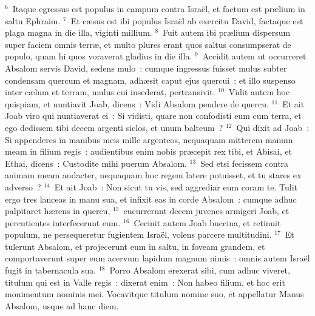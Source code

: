${}^{6}$~Itaque egressus est populus in campum contra Isra\"el, et factum est pr\ae lium in saltu Ephraim.
${}^{7}$~Et c\ae sus est ibi populus Isra\"el ab exercitu David, factaque est plaga magna in die illa, viginti millium.
${}^{8}$~Fuit autem ibi pr\ae lium dispersum super faciem omnis terr\ae , et multo plures erant quos saltus consumpserat de populo, quam hi quos voraverat gladius in die illa.
${}^{9}$~Accidit autem ut occurreret Absalom servis David, sedens mulo~: cumque ingressus fuisset mulus subter condensam quercum et magnam, adh\ae sit caput ejus quercui~: et illo suspenso inter c\ae lum et terram, mulus cui insederat, pertransivit.
${}^{10}$~Vidit autem hoc quispiam, et nuntiavit Joab, dicens~: Vidi Absalom pendere de quercu.
${}^{11}$~Et ait Joab viro qui nuntiaverat ei~: Si vidisti, quare non confodisti eum cum terra, et ego dedissem tibi decem argenti siclos, et unum balteum~?
${}^{12}$~Qui dixit ad Joab~: Si appenderes in manibus meis mille argenteos, nequaquam mitterem manum meam in filium regis~: audientibus enim nobis pr\ae cepit rex tibi, et Abisai, et Ethai, dicens~: Custodite mihi puerum Absalom.
${}^{13}$~Sed etsi fecissem contra animam meam audacter, nequaquam hoc regem latere potuisset, et tu stares ex adverso~?
${}^{14}$~Et ait Joab~: Non sicut tu vis, sed aggrediar eum coram te. Tulit ergo tres lanceas in manu sua, et infixit eas in corde Absalom~: cumque adhuc palpitaret h\ae rens in quercu,
${}^{15}$~cucurrerunt decem juvenes armigeri Joab, et percutientes interfecerunt eum.
${}^{16}$~Cecinit autem Joab buccina, et retinuit populum, ne persequeretur fugientem Isra\"el, volens parcere multitudini.
${}^{17}$~Et tulerunt Absalom, et projecerunt eum in saltu, in foveam grandem, et comportaverunt super eum acervum lapidum magnum nimis~: omnis autem Isra\"el fugit in tabernacula sua.
${}^{18}$~Porro Absalom erexerat sibi, cum adhuc viveret, titulum qui est in Valle regis~: dixerat enim~: Non habeo filium, et hoc erit monimentum nominis mei. Vocavitque titulum nomine suo, et appellatur Manus Absalom, usque ad hanc diem.


